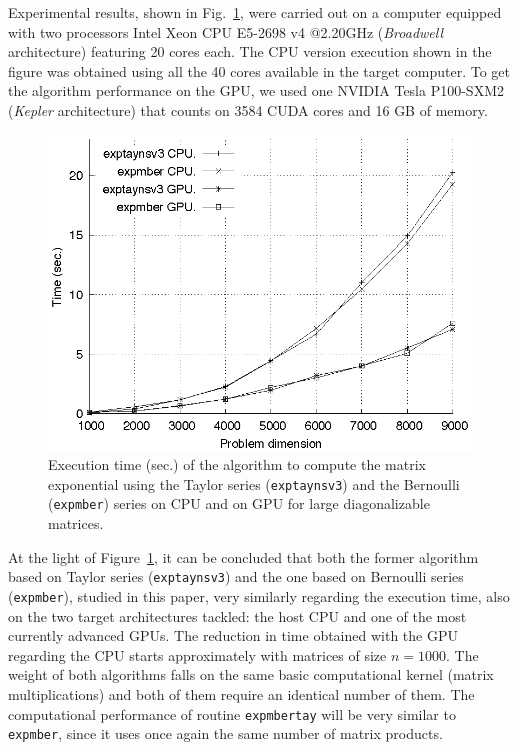 \documentclass[preprint,10pt,numbers,sort&compress]{elsarticle}
\begin{document}
Experimental results, shown in Fig.~\ref{fig:results_gpu}, were carried out on a computer equipped with two processors 
Intel Xeon CPU E5-2698 v4 @2.20GHz (\emph{Broadwell} architecture) featuring 20 cores each.
The CPU version execution shown in the figure was obtained using all the 40 cores available in the target computer. 
To get the algorithm performance on the GPU, we used one NVIDIA Tesla P100-SXM2 (\emph{Kepler} architecture) that counts on 3584 CUDA cores and 16 GB of memory.

\begin{figure}[!t]
        \setlength{\tabcolsep}{-10pt}
        \begin{center}
                \includegraphics[scale=0.9]{Figures/Tiempoparalelo.eps}
        \end{center}
        \caption{\label{fig:results_gpu} Execution time (sec.) of the algorithm to compute the matrix exponential using the Taylor series (\texttt{exptaynsv3}) and the Bernoulli (\texttt{expmber}) series on CPU and on GPU for large diagonalizable matrices.}
\end{figure}

At the light of Figure~\ref{fig:results_gpu}, it can be concluded that both the former algorithm based on Taylor series (\texttt{exptaynsv3}) and the one based on Bernoulli series (\texttt{expmber}), studied in this paper, very similarly regarding the execution time, also on the two target architectures tackled: the host CPU and one of the most currently advanced GPUs.  
The reduction in time obtained with the GPU regarding the CPU starts approximately with matrices of size $n=1000$.
The weight of both algorithms falls on the same basic computational kernel (matrix multiplications) and both of them require an identical number of them. The computational performance of routine \texttt{expmbertay} will be very similar to \texttt{expmber}, since it uses once again the same number of matrix products.
\end{document}
